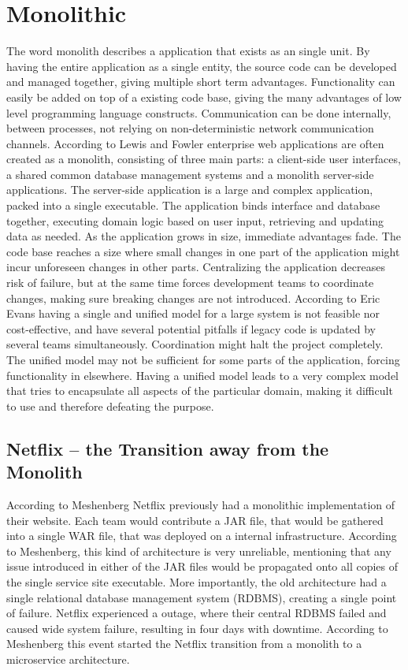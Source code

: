 \section{Monolithic}
The word monolith describes a application that exists as an single unit. By having the entire application as a single entity, the source code can be developed and managed together, giving multiple short term advantages\cite[p.~68]{long2017cloud}. Functionality can easily be added on top of a existing code base, giving the many advantages of low level programming language constructs. Communication can be done internally, between processes, not relying on non-deterministic network communication channels. 
According to Lewis and Fowler\cite{fowler2014microservices} enterprise web applications are often created as a monolith, consisting of three main parts: a client-side user interfaces, a shared common database management systems and a monolith server-side applications. The server-side application is a large and complex application, packed into a single executable. The application binds interface and database together, executing domain logic based on user input, retrieving and updating data as needed. 
As the application grows in size, immediate advantages fade. The code base reaches a size where small changes in one part of the application might incur unforeseen changes in other parts. Centralizing the application decreases risk of failure, but at the same time forces development teams to coordinate changes, making sure breaking changes are not introduced\cite[p.~68]{long2017cloud}. 
According to Eric Evans having a single and unified model for a large system is not feasible nor cost-effective, and have several potential pitfalls if legacy code is updated by several teams simultaneously. Coordination might halt the project completely. The unified model may not be sufficient for some parts of the application, forcing functionality in elsewhere. Having a unified model leads to a very complex model that tries to encapsulate all aspects of the particular domain, making it difficult to use and therefore defeating the purpose\cite[p.~331]{evans2004domain}.

\subsection{Netflix -- the Transition away from the Monolith}
According to Meshenberg\cite{meshenberg2016microservices} Netflix previously had a monolithic implementation of their website. Each team would contribute a JAR file, that would be gathered into a single WAR file, that was deployed on a internal infrastructure. According to Meshenberg, this kind of architecture is very unreliable, mentioning that any issue introduced in either of the JAR files would be propagated onto all copies of the single service site executable. More importantly, the old architecture had a single relational database management system (RDBMS), creating a single point of failure\cite{meshenberg2016microservices}. Netflix experienced a outage, where their central RDBMS failed and caused wide system failure, resulting in four days with downtime. According to Meshenberg this event started the Netflix transition from a monolith to a microservice architecture.

